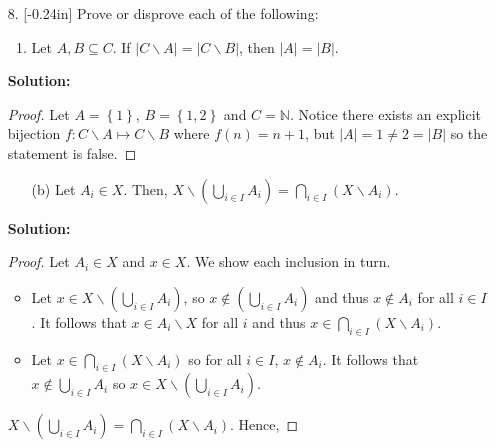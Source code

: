 \documentclass[letterpaper,12pt]{article}
\newcommand{\set}[1]{\left\{ #1 \right\}}
\theoremstyle{definition}
\begin{document}
\pagebreak
\begin{enumerate}
    \item[8.] \reversemarginpar{}[-0.24in] Prove or disprove each of the following: \begin{enumerate}
        \item Let $A,B \subseteq C$. If $|C \backslash A| = |C \backslash B|$, then $|A| = |B|$.
    \end{enumerate}
     \begin{mdframed}
            \textbf{Solution:}
            \renewcommand{\proofname}{Disproof}
            \begin{proof}
                 Let $A  = \set{1}$, $B = \set{1,2}$ and $C = \mathbb{N}$. Notice there exists an explicit bijection $f: C \backslash A \mapsto  C \backslash B$ where $f(n) = n+1$, but $|A| = 1 \neq 2 = |B|$ so the statement is false.
            \end{proof}
        \end{mdframed}
\end{enumerate}
\pagebreak
\begin{enumerate}
    \item[] \begin{enumerate}
        \item[(b)] Let $A_i \in X$. Then, $X \backslash (\bigcup_{i \in I} A_i)   = \bigcap_{i \in I} (X \backslash A_i )$.
    \end{enumerate}
     \begin{mdframed}
            \textbf{Solution:}
            \begin{proof}
                Let $A_i \in X$ and $x \in X$. We show each inclusion in turn.
                \begin{itemize}
                    \item Let $x \in X \backslash (\bigcup_{i \in I} A_i)$, so $x \notin (\bigcup_{i \in I} A_i)$ and thus $x \notin A_i$ for all $i \in I$. It follows that $x \in A_i \backslash X$ for all $i$ and thus $x \in  \bigcap_{i \in I} (X \backslash A_i)$.
                    \item Let $x \in  \bigcap_{i \in I} (X \backslash A_i)$ so for all $i \in I$, $x \notin A_i$. It follows that $x \notin \bigcup_{i \in I} A_i$ so $x \in X \backslash (\bigcup_{i \in I} A_i)$.
                \end{itemize}$X \backslash (\bigcup_{i \in I} A_i)   = \bigcap_{i \in I} (X \backslash A_i )$.
                Hence, 
            \end{proof}
        \end{mdframed}
\end{enumerate}
\end{document}
